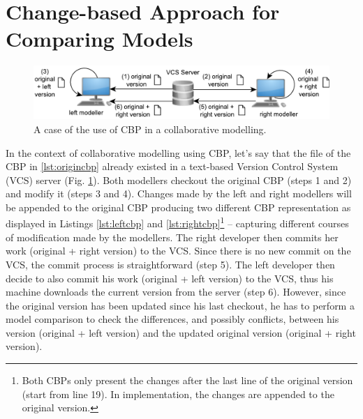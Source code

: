 \documentclass{llncs}
\begin{document}
\vspace{-20pt}
\section{Change-based Approach for Comparing Models}
\label{sec:change_based_approach_for_comparing_models}

\vspace{-20pt}
 \begin{figure}
    \includegraphics[width=\linewidth]{images/VCS}
    \caption{A case of the use of CBP in a collaborative modelling.}
    \label{fig:vcs}
\end{figure}

\vspace{-10pt}
In the context of collaborative modelling using CBP, let's say that the file of the CBP in \ref{lst:origincbp} already existed in a text-based Version Control System (VCS) server (Fig. \ref{fig:vcs}). Both modellers checkout the original CBP (steps 1 and 2) and modify it (steps 3 and 4). Changes made by the left and right modellers will be appended to the original CBP producing two different CBP representation as displayed in Listings \ref{lst:leftcbp} and \ref{lst:rightcbp}\footnote{Both CBPs only present the changes after the last line of the original version (start from line 19). In implementation, the changes are appended to the original version.} -- capturing different courses of modification made by the modellers. The right developer then commits her work (original + right version) to the VCS. Since there is no new commit on the VCS, the commit process is straightforward (step 5). The left developer then decide to also commit his work (original + left version) to the VCS, thus his machine downloads the current version from the server (step 6). However, since the original version has been updated since his last checkout, he has to perform a model comparison to check the differences, and possibly conflicts, between his version (original + left version) and the updated original version (original + right version). 
\end{document}
